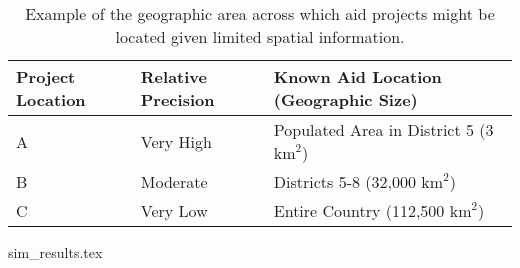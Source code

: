 \newpage
\begin{table}[!htbp]
	\begin{tabular}{| l | l | l |}
	\hline
	Project Location & Relative Precision & Known Aid Location (Geographic Size)\\
    \hline
    A &  Very High & Populated Area in District 5 (3 $\text{km}^2$) \\ \hline
    B &  Moderate & Districts 5-8 (32,000 $\text{km}^2$) \\ \hline
    C &  Very Low & Entire Country (112,500 $\text{km}^2$) \\ \hline
	\end{tabular}
	\caption{Example of the geographic area across which aid projects might be located given limited spatial information.}\label{precision_example}
\end{table}

\newpage
{sim_results.tex}

\newpage
